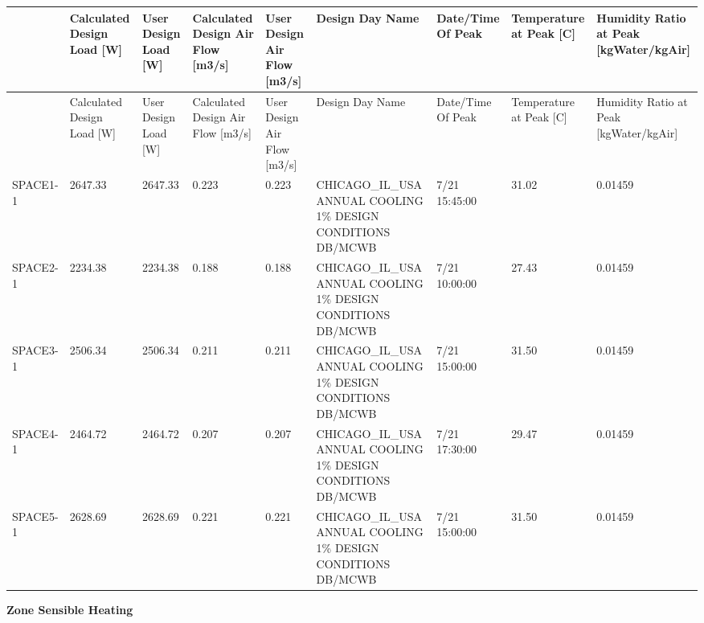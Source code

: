 {\scriptsize
\begin{longtable}[c]{>{\raggedright}p{0.66in}>{\raggedright}p{0.66in}>{\raggedright}p{0.66in}>{\raggedright}p{0.66in}>{\raggedright}p{0.66in}>{\raggedright}p{0.66in}>{\raggedright}p{0.66in}>{\raggedright}p{0.66in}>{\raggedright}p{0.66in}}
\toprule 
 & Calculated Design Load [W] & User Design Load [W] & Calculated Design Air Flow [m3/s] & User Design Air Flow [m3/s] & Design Day Name & Date/Time Of Peak & Temperature at Peak [C] & Humidity Ratio at Peak [kgWater/kgAir] \tabularnewline
\midrule
\endfirsthead

\toprule 
 & Calculated Design Load [W] & User Design Load [W] & Calculated Design Air Flow [m3/s] & User Design Air Flow [m3/s] & Design Day Name & Date/Time Of Peak & Temperature at Peak [C] & Humidity Ratio at Peak [kgWater/kgAir] \tabularnewline
\midrule
\endhead

SPACE1-1 & 2647.33 & 2647.33 & 0.223 & 0.223 & CHICAGO\-\_IL\-\_USA ANNUAL COOLING 1\% DESIGN CONDITIONS DB/MCWB & 7/21 15:45:00 & 31.02 & 0.01459 \tabularnewline
SPACE2-1 & 2234.38 & 2234.38 & 0.188 & 0.188 & CHICAGO\-\_IL\-\_USA ANNUAL COOLING 1\% DESIGN CONDITIONS DB/MCWB & 7/21 10:00:00 & 27.43 & 0.01459 \tabularnewline
SPACE3-1 & 2506.34 & 2506.34 & 0.211 & 0.211 & CHICAGO\-\_IL\-\_USA ANNUAL COOLING 1\% DESIGN CONDITIONS DB/MCWB & 7/21 15:00:00 & 31.50 & 0.01459 \tabularnewline
SPACE4-1 & 2464.72 & 2464.72 & 0.207 & 0.207 & CHICAGO\-\_IL\-\_USA ANNUAL COOLING 1\% DESIGN CONDITIONS DB/MCWB & 7/21 17:30:00 & 29.47 & 0.01459 \tabularnewline
SPACE5-1 & 2628.69 & 2628.69 & 0.221 & 0.221 & CHICAGO\-\_IL\-\_USA ANNUAL COOLING 1\% DESIGN CONDITIONS DB/MCWB & 7/21 15:00:00 & 31.50 & 0.01459 \tabularnewline
\bottomrule
\end{longtable}}

\textbf{Zone Sensible Heating}

